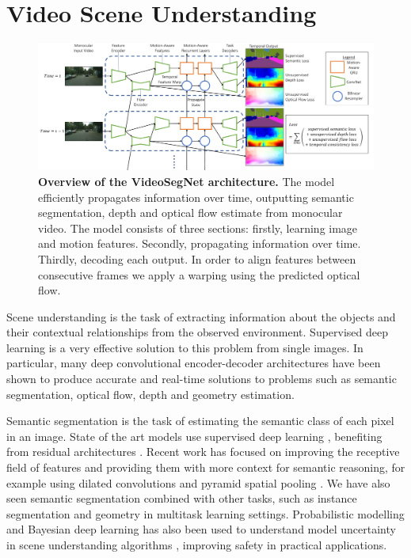 \section{Video Scene Understanding} 

\begin{figure}[!t]
\begin{center}
\includegraphics[width=\linewidth]{temporal_model.pdf}
\end{center}
   \caption[Overview of the VideoSegNet architecture.]{\textbf{Overview of the VideoSegNet architecture.} The model efficiently propagates information over time, outputting semantic segmentation, depth and optical flow estimate from monocular video. The model consists of three sections: firstly, learning image and motion features. Secondly, propagating information over time. Thirdly, decoding each output. In order to align features between consecutive frames we apply a warping using the predicted optical flow.}
\label{fig:arch}
\end{figure}

Scene understanding is the task of extracting information about the objects and their contextual relationships from the observed environment. Supervised deep learning is a very effective solution to this problem from single images. In particular, many deep convolutional encoder-decoder architectures have been shown to produce accurate and real-time solutions to problems such as semantic segmentation, optical flow, depth and geometry estimation.

Semantic segmentation is the task of estimating the semantic class of each pixel in an image. State of the art models use supervised deep learning \citep{badrinarayanan2017segnet,long2015fully}, benefiting from residual architectures \citep{he2016deep,huang2017densely}. Recent work has focused on improving the receptive field of features and providing them with more context for semantic reasoning, for example using dilated convolutions \citep{YuKoltun2016} and pyramid spatial pooling \citep{zhao2017pspnet}. We have also seen semantic segmentation combined with other tasks, such as instance segmentation \citep{he2017maskrcnn} and geometry \citep{kendall2017multi} in multitask learning settings. Probabilistic modelling and Bayesian deep learning has also been used to understand model uncertainty in scene understanding algorithms \citep{kendall2017uncertainties,kendall2015bayesian}, improving safety in practical applications.

